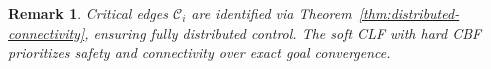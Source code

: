 \documentclass[conference]{IEEEconf}
\theoremstyle{plain}
\newtheorem{remark}{Remark}
\begin{document}
\begin{remark}
Critical edges $\mathcal{C}_i$ are identified via Theorem~\ref{thm:distributed-connectivity}, ensuring fully distributed control. The soft CLF with hard CBF prioritizes safety and connectivity over exact goal convergence.
\end{remark}





\end{document}
